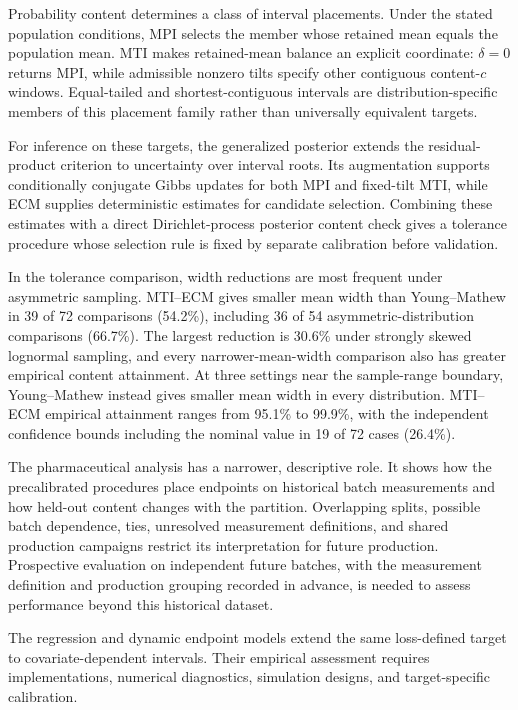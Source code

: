 Probability content determines a class of interval placements. Under the stated
population conditions, MPI selects the member whose retained mean equals the
population mean. MTI makes retained-mean balance an explicit coordinate:
\(\delta=0\) returns MPI, while admissible nonzero tilts specify other
contiguous content-\(c\) windows. Equal-tailed and shortest-contiguous
intervals are distribution-specific members of this placement family rather
than universally equivalent targets.

For inference on these targets, the generalized posterior extends the
residual-product criterion to uncertainty over interval roots. Its augmentation
supports conditionally conjugate Gibbs updates for both MPI and fixed-tilt
MTI, while ECM supplies deterministic estimates for candidate selection.
Combining these estimates with a direct Dirichlet-process posterior content
check gives a tolerance procedure whose selection rule is fixed by separate
calibration before validation.

In the tolerance comparison, width reductions are most frequent under
asymmetric sampling. MTI--ECM gives smaller mean width than Young--Mathew in
39 of 72 comparisons (54.2\%), including 36 of 54 asymmetric-distribution
comparisons (66.7\%). The largest reduction is 30.6\% under strongly skewed
lognormal sampling, and every narrower-mean-width comparison also has greater
empirical content attainment. At three settings near the sample-range boundary,
Young--Mathew instead gives smaller mean width in every distribution. MTI--ECM
empirical attainment ranges from 95.1\% to 99.9\%, with the independent
confidence bounds including the nominal value in 19 of 72 cases (26.4\%).

The pharmaceutical analysis has a narrower, descriptive role. It shows how the
precalibrated procedures place endpoints on historical batch measurements and
how held-out content changes with the partition. Overlapping splits, possible
batch dependence, ties, unresolved measurement definitions, and shared
production campaigns restrict its interpretation for future production.
Prospective evaluation on independent future batches, with the measurement
definition and production grouping recorded in advance, is needed to assess
performance beyond this historical dataset.

The regression and dynamic endpoint models extend the same loss-defined
target to covariate-dependent intervals. Their empirical assessment requires
implementations, numerical diagnostics, simulation designs, and
target-specific calibration.

